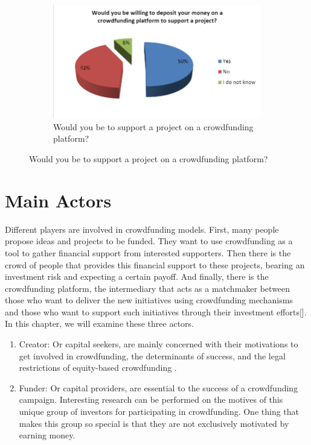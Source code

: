 \begin{center}
\begin{figure}
      \begin{subfigure}{.5\textwidth}
            \centering
            \includegraphics[scale=0.30]{assets/willing.png}
            \caption{Would you be to support a project on a crowdfunding platform?}
            \label{fig:willing}
      \end{subfigure}
      
\end{figure}

\end{center}



\section*{ Main Actors }
Different players are involved in crowdfunding models. First, many people propose ideas and
projects to be funded. They want to use crowdfunding as a tool to gather financial support from interested supporters.
Then there is the crowd of people that provides this financial support to these projects, bearing an investment
risk and expecting a certain payoff. And finally, there is the crowdfunding platform, the intermediary that acts
as a matchmaker between those who want to deliver the new initiatives using crowdfunding mechanisms
and those who want to support such initiatives through their investment efforts[\cite{10.1108/09564231111155079}]. In this chapter, we will
examine these three actors.

\begin{enumerate}
      \item Creator:
            Or capital seekers, are mainly concerned with their motivations to get involved in crowdfunding, the determinants of success, and the legal restrictions of equity-based crowdfunding \cite{10.1007/978-3-319-18017-5_3}.

      \item Funder:
      Or capital providers, are essential to the success of a crowdfunding campaign. Interesting research can be performed on the motives of this unique group of investors for participating in crowdfunding. One thing that
            makes this group so special is that they are not exclusively motivated by earning money.

\end{enumerate}
